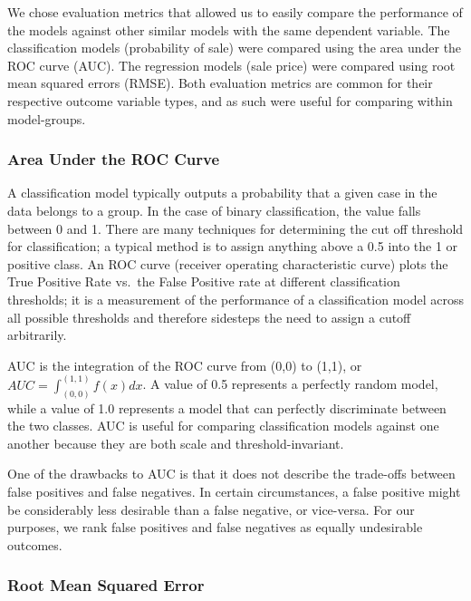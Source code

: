 \documentclass[conference,final,]{IEEEtran}
\begin{document}
We chose evaluation metrics that allowed us to easily compare the
performance of the models against other similar models with the same
dependent variable. The classification models (probability of sale) were
compared using the area under the ROC curve (AUC). The regression models
(sale price) were compared using root mean squared errors (RMSE). Both
evaluation metrics are common for their respective outcome variable
types, and as such were useful for comparing within model-groups.

\hypertarget{area-under-the-roc-curve}{%
\subsubsection{Area Under the ROC
Curve}\label{area-under-the-roc-curve}}

A classification model typically outputs a probability that a given case
in the data belongs to a group. In the case of binary classification,
the value falls between 0 and 1. There are many techniques for
determining the cut off threshold for classification; a typical method
is to assign anything above a 0.5 into the 1 or positive class. An ROC
curve (receiver operating characteristic curve) plots the True Positive
Rate vs.~the False Positive rate at different classification thresholds;
it is a measurement of the performance of a classification model across
all possible thresholds and therefore sidesteps the need to assign a
cutoff arbitrarily.

AUC is the integration of the ROC curve from (0,0) to (1,1), or
\(AUC = \int_{(0,0)}^{(1,1)} f(x)dx\). A value of 0.5 represents a
perfectly random model, while a value of 1.0 represents a model that can
perfectly discriminate between the two classes. AUC is useful for
comparing classification models against one another because they are
both scale and threshold-invariant.

One of the drawbacks to AUC is that it does not describe the trade-offs
between false positives and false negatives. In certain circumstances, a
false positive might be considerably less desirable than a false
negative, or vice-versa. For our purposes, we rank false positives and
false negatives as equally undesirable outcomes.

\hypertarget{root-mean-squared-error}{%
\subsubsection{Root Mean Squared Error}\label{root-mean-squared-error}}
\end{document}
